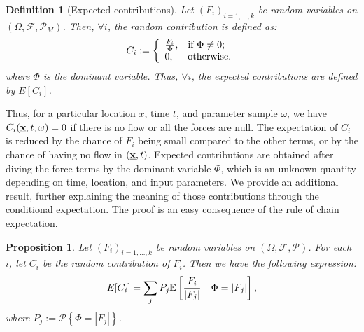 \documentclass{article}
\newtheorem{definition}[theorem]{Definition}
\newtheorem{proposition}[theorem]{Proposition}
\begin{document}
\begin{definition}[Expected contributions]
Let $(F_i)_{i=1,\dots, k}$ be random variables on $(\Omega, \mathcal F, \mathcal P_M)$. Then, $\forall i$, the random contribution is defined as:
$$C_i:=\left\{
\begin{array}{ll}
      \frac{F_i}{\Phi}, & \textrm{if }\Phi\neq 0; \\
      0, & \hbox{otherwise.}
    \end{array}
  \right.$$
where $\Phi$ is the dominant variable. Thus, $\forall i$, the expected contributions are defined by $E\left[C_i\right]$.
\end{definition}

Thus, for a particular location $x$, time $t$, and parameter sample $\omega$, we have $C_i(\underline{\textbf x},t,\omega)=0$ if there is no flow or all the forces are null. The expectation of $C_i$ is reduced by the chance of $F_i$ being small compared to the other terms, or by the chance of having no flow in $(\underline{\textbf x},t)$. Expected contributions are obtained after diving the force terms by the dominant variable $\Phi$, which is an unknown quantity depending on time, location, and input parameters. We provide an additional result, further explaining the meaning of those contributions through the conditional expectation. The proof is an easy consequence of the rule of chain expectation.

\begin{proposition}
Let $(F_i)_{i=1,\dots, k}$ be random variables on $(\Omega, \mathcal F, \mathcal P)$. For each $i$, let $C_i$ be the random contribution of $F_i$. Then we have the following expression:
$$E[C_i]=\sum_j P_j \mathbb E\left[\frac{F_i}{|F_j|}\ \Big{|}\ \Phi=|F_j|\right],$$
where $P_j:=\mathcal P\left\{\Phi=|F_j|\right\}$.
\end{proposition}
\end{document}
